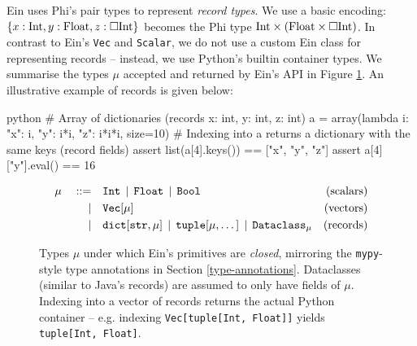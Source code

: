 Ein uses Phi's pair types to represent \textit{record types}. We use a basic encoding: $\{ x: \mathrm{Int}, y: \mathrm{Float}, z: \Box{\mathrm{Int}} \}$ becomes the Phi type $\phipairtype{\phiinttype}{\left( \phifloattype \times \phivectype{\phiinttype} \right)}$. In contrast to Ein's \texttt{Vec} and \texttt{Scalar}, we do not use a custom Ein class for representing records -- instead, we use Python's builtin container types. We summarise the types $\mu$ accepted and returned by Ein's API in Figure \ref{fig:ein-values}.
An illustrative example of records is given below:
\begin{center} 
\begin{cminted}{python}
# Array of dictionaries (records {x: int, y: int, z: int})
a = array(lambda i: {"x": i, "y": i*i, "z": i*i*i}, size=10)
# Indexing into a returns a dictionary with the same keys (record fields)
assert list(a[4].keys()) == ["x", "y", "z"]
assert a[4]["y"].eval() == 16
\end{cminted}
\end{center}

\begin{figure}
    \centering
    \begin{align*}
    \mu \quad::=&\quad 
    \text{\texttt{Int}}
    \,\mid\,
    \text{\texttt{Float}}
    \,\mid\,
    \text{\texttt{Bool}}
    & \text{(scalars)} \\
    \mid&\quad
    \text{\texttt{Vec}}[\mu]
    & \text{(vectors)} \\
    \mid&\quad
    \text{\texttt{dict}}[\text{\texttt{str}}, \mu] 
    \,\mid\, \text{\texttt{tuple}}[\mu, \dots] 
    \,\mid\, \texttt{Dataclass}_\mu
    & \text{(records)}
    \end{align*}
    \caption{Types $\mu$ under which Ein's primitives are \textit{closed}, mirroring the \texttt{mypy}-style type annotations in Section \ref{type-annotations}. Dataclasses (similar to Java's records) are assumed to only have fields of $\mu$. Indexing into a vector of records returns the actual Python container -- e.g. indexing \texttt{Vec[tuple[Int, Float]]} yields \texttt{tuple[Int, Float]}.}
    \label{fig:ein-values}
\end{figure}


